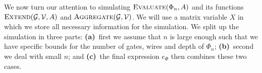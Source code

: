 %
%
%

\medskip
We now turn our attention to simulating $\textsc{Evaluate}(\Phi_n,A)$ and its functions $\textsc{Extend}(\mathcal{G},\mathcal{V},A)$ and $\textsc{Aggregate}(\mathcal{G},\mathcal{V})$. We will use a matrix variable $X$ in which we store all necessary information for the simulation. We split up the simulation in three parts:
\textbf{(a)}~first we assume that $n$ is large enough such that we have specific bounds for the number of gates, wires
and depth of $\Phi_n$; \textbf{(b)}~second we deal with small $n$; and \textbf{(c)}~the final expression $e_\Phi$ then combines these two cases.

